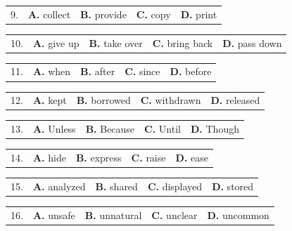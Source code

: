 \documentclass[UTF8,11pt]{ctexart}
\begin{document}
\noindent\begin{tabularx}{\linewidth}{@{}lXXXX@{}}9. & \textbf{A.} collect & \textbf{B.} provide & \textbf{C.} copy & \textbf{D.} print\\\end{tabularx}\par

\noindent\begin{tabularx}{\linewidth}{@{}lXXXX@{}}10. & \textbf{A.} give up & \textbf{B.} take over & \textbf{C.} bring back & \textbf{D.} pass down\\\end{tabularx}\par

\noindent\begin{tabularx}{\linewidth}{@{}lXXXX@{}}11. & \textbf{A.} when & \textbf{B.} after & \textbf{C.} since & \textbf{D.} before\\\end{tabularx}\par

\noindent\begin{tabularx}{\linewidth}{@{}lXXXX@{}}12. & \textbf{A.} kept & \textbf{B.} borrowed & \textbf{C.} withdrawn & \textbf{D.} released\\\end{tabularx}\par

\noindent\begin{tabularx}{\linewidth}{@{}lXXXX@{}}13. & \textbf{A.} Unless & \textbf{B.} Because & \textbf{C.} Until & \textbf{D.} Though\\\end{tabularx}\par

\noindent\begin{tabularx}{\linewidth}{@{}lXXXX@{}}14. & \textbf{A.} hide & \textbf{B.} express & \textbf{C.} raise & \textbf{D.} ease\\\end{tabularx}\par

\noindent\begin{tabularx}{\linewidth}{@{}lXXXX@{}}15. & \textbf{A.} analyzed & \textbf{B.} shared & \textbf{C.} displayed & \textbf{D.} stored\\\end{tabularx}\par

\noindent\begin{tabularx}{\linewidth}{@{}lXXXX@{}}16. & \textbf{A.} unsafe & \textbf{B.} unnatural & \textbf{C.} unclear & \textbf{D.} uncommon\\\end{tabularx}\par
\end{document}
